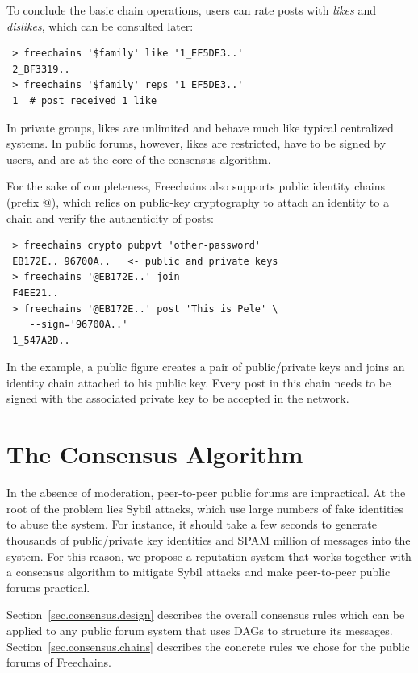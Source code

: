 \documentclass[10pt,journal,compsoc]{IEEEtran}
\newcommand{\FC}       {Freechains\xspace}
\begin{document}
To conclude the basic chain operations, users can rate posts with \emph{likes}
and \emph{dislikes}, which can be consulted later:

{\footnotesize
\begin{verbatim}
 > freechains '$family' like '1_EF5DE3..'
 2_BF3319..
 > freechains '$family' reps '1_EF5DE3..'
 1  # post received 1 like
\end{verbatim}
}

In private groups, likes are unlimited and behave much like typical centralized
systems.
In public forums, however, likes are restricted, have to be signed by users,
and are at the core of the consensus algorithm.

For the sake of completeness, \FC also supports public identity chains (prefix
$@$), which relies on public-key cryptography to attach an identity to a chain
and verify the authenticity of posts:

{\footnotesize
\begin{verbatim}
 > freechains crypto pubpvt 'other-password'
 EB172E.. 96700A..   <- public and private keys
 > freechains '@EB172E..' join
 F4EE21..
 > freechains '@EB172E..' post 'This is Pele' \
    --sign='96700A..'
 1_547A2D..
\end{verbatim}
}

In the example, a public figure creates a pair of public/private keys and joins
an identity chain attached to his public key.
Every post in this chain needs to be signed with the associated private key to
be accepted in the network.

\section{The Consensus Algorithm}
\label{sec.consensus}

In the absence of moderation, peer-to-peer public forums are impractical.
At the root of the problem lies Sybil attacks, which use large numbers of fake
identities to abuse the system.
For instance, it should take a few seconds to generate thousands of
public/private key identities and SPAM million of messages into the system.
For this reason, we propose a reputation system that works together with a
consensus algorithm to mitigate Sybil attacks and make peer-to-peer public
forums practical.

Section~\ref{sec.consensus.design} describes the overall consensus rules which
can be applied to any public forum system that uses DAGs to structure its
messages.
Section~\ref{sec.consensus.chains} describes the concrete rules we chose for
the public forums of \FC.
\end{document}
